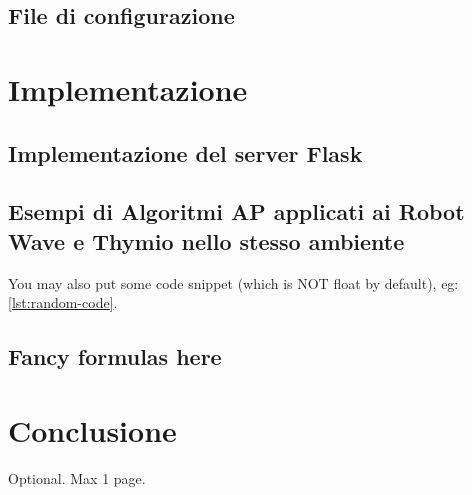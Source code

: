 \documentclass[12pt,a4paper,openright,twoside]{book}
\begin{document}
\section{File di configurazione}

\chapter{Implementazione}
\label{chap:implementazione}

\section{Implementazione del server Flask}

\section{Esempi di Algoritmi AP applicati ai Robot Wave e Thymio nello stesso ambiente}

You may also put some code snippet (which is NOT float by default), eg: \cref{lst:random-code}.



\section{Fancy formulas here}

\chapter{Conclusione}
\label{chap:conclusione}


\backmatter

\nocite{*} %




\begin{acknowledgements} %
Optional. Max 1 page.
\end{acknowledgements}
\end{document}
